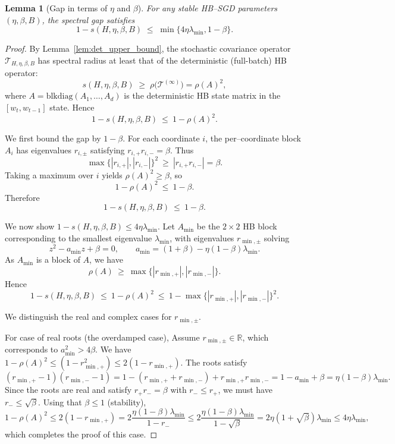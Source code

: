 \documentclass{article}
\newtheorem{lemma}{Lemma}
\begin{document}
\begin{lemma}[Gap in terms of $\eta$ and $\beta$]
\label{lem:gap-etabeta}
For any stable HB--SGD parameters $(\eta,\beta,B)$, the spectral gap satisfies
\[
  1 - s(H,\eta,\beta,B)
  \;\le\;
  \min\big\{ 4 \eta \lambda_{\min} , 1-\beta \big\}.
\]
\end{lemma}

\begin{proof}
By Lemma~\ref{lem:det_upper_bound}, the stochastic covariance operator
$\mathcal{T}_{H,\eta,\beta,B}$ has spectral radius at least that of the
deterministic (full-batch) HB operator:
\[
s(H,\eta,\beta,B)
\;\ge\;
\rho\big(\mathcal{T}^{(\infty)}\big)
=
\rho(A)^2,
\]
where $A=\mathrm{blkdiag}(A_1,\dots,A_d)$ is the deterministic HB state
matrix in the $[w_t,w_{t-1}]$ state. Hence
\[
1 - s(H,\eta,\beta,B)
\ \le\
1 - \rho(A)^2.
\]

We first bound the gap by $1-\beta$. For each coordinate $i$, the
per–coordinate block $A_i$ has eigenvalues $r_{i,\pm}$ satisfying
$r_{i,+}r_{i,-}=\beta$. Thus
\[
\max\{|r_{i,+}|,|r_{i,-}|\}^2
\ \ge\ |r_{i,+}r_{i,-}| = \beta.
\]
Taking a maximum over $i$ yields $\rho(A)^2\ge\beta$, so
\[
1 - \rho(A)^2
\ \le\ 1 - \beta.
\]
Therefore
\[
1 - s(H,\eta,\beta,B)
\ \le\ 1 - \beta.
\]

We now show $1-s(H,\eta,\beta,B)\le 4\eta\lambda_{\min}$.
Let $A_{\min}$ be the $2\times2$ HB block corresponding to the smallest
eigenvalue $\lambda_{\min}$, with eigenvalues $r_{\min,\pm}$ solving
\[
z^2 - a_{\min} z + \beta = 0,
\qquad
a_{\min}=(1+\beta)-\eta(1-\beta)\lambda_{\min}.
\]
As $A_{\min}$ is a block of $A$, we have
\[
\rho(A)
\ \ge\ \max\{|r_{\min,+}|,|r_{\min,-}|\}.
\]
Hence
\[
1 - s(H,\eta,\beta,B)
\ \le\ 1 - \rho(A)^2
\ \le\ 1 - \max\{|r_{\min,+}|,|r_{\min,-}|\}^2.
\]

We distinguish the real and complex cases for $r_{\min,\pm}$.


For case of real roots (the overdamped case),
Assume $r_{\min,\pm}\in\mathbb{R}$, which corresponds to $a_{\min}^2>4\beta$.
We have $1 - \rho(A)^2 \leq (1-r_{\min,+}^2) \le 2(1-r_{\min,+})$.
The roots satisfy
\[
(r_{\min,+}-1)(r_{\min,-}-1)
= 1 - (r_{\min,+}+r_{\min,-}) + r_{\min,+}r_{\min,-}
= 1 - a_{\min} + \beta
= \eta(1-\beta)\lambda_{\min}.
\]
Since the roots are real and satisfy $r_+ r_- = \beta$ with $r_- \le
r_+$, we must have $r_- \le \sqrt{\beta}$. Using that $\beta\leq 1$ (stability),
\[
1 - \rho(A)^2 \leq 2(1-r_{\min,+}) = 2\frac{\eta(1-\beta)\lambda_{\min}}{1-r_-}
\le 2\frac{\eta(1-\beta)\lambda_{\min}}{1-\sqrt{\beta}}
= 2\eta(1+\sqrt{\beta})\lambda_{\min}
\leq 4\eta\lambda_{\min},
\]
which completes the proof of this case.


\end{proof}
\end{document}
